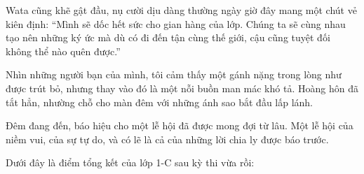 \documentclass[../main.tex]{subfiles}
\begin{document}
Wata cũng khẽ gật đầu, nụ cười dịu dàng thường ngày giờ đây mang một chút vẻ kiên định: ``Mình sẽ dốc hết sức cho gian hàng của lớp. Chúng ta sẽ cùng nhau tạo nên những ký ức mà dù có đi đến tận cùng thế giới, cậu cũng tuyệt đối không thể nào quên được.''

Nhìn những người bạn của mình, tôi cảm thấy một gánh nặng trong lòng như được trút bỏ, nhưng thay vào đó là một nỗi buồn man mác khó tả. Hoàng hôn đã tắt hẳn, nhường chỗ cho màn đêm với những ánh sao bắt đầu lấp lánh.

Đêm đang đến, báo hiệu cho một lễ hội đã được mong đợi từ lâu. Một lễ hội của niềm vui, của sự tự do, và có lẽ là cả của những lời chia ly được báo trước.

\newpage

\trva

Dưới đây là điểm tổng kết của lớp 1-C sau kỳ thi vừa rồi:
\end{document}
